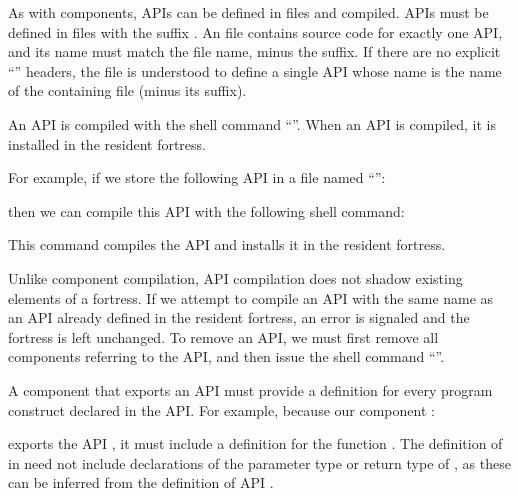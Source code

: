 As with components, APIs can be defined in files and compiled. APIs
must be defined in files with the suffix .
An  file contains
source code for exactly one API, and its name must match the file name,
minus the suffix.
If there are  no explicit ``''
headers, the file is understood to define a single API whose name is
the name of the containing file (minus its suffix).

An API is compiled with the shell command ``''.
When an API is compiled,
it is installed in the resident fortress.


For example, if we store
the following API in a file named ``'':

then we can compile this API with the following shell command:


This command compiles the API 
and installs it in the resident fortress.



Unlike component compilation, API compilation does not shadow
existing elements of a fortress.
If we attempt to compile an API with the same name as an API
already defined
in the resident fortress, an error is signaled
and the fortress is left unchanged. To remove an API, we must
first remove all components referring to the API,
and then issue the shell command ``''.


A component that exports an API must provide a definition
for every program construct declared in the API. For example, because
our component :

exports the API , it must include a definition for the
function .
The definition of  in  need not include
declarations of the
parameter type or return type of , as these can be inferred
from the
definition of API .

